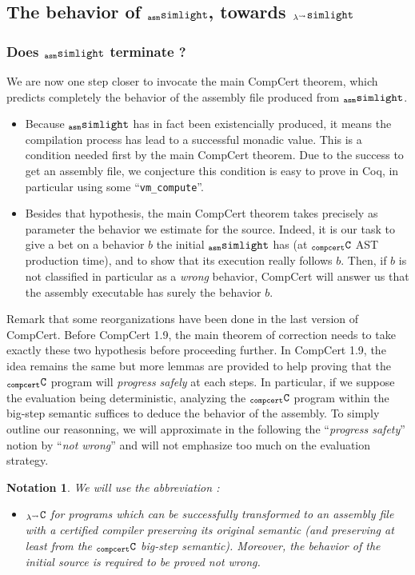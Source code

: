 \documentclass[a4paper, 11pt]{article}
\newcommand{\compcert}{CompCert 1.9\xspace}
\newcommand{\ccert}{CompCert\xspace}
\newcommand{\aSL}{$_{\tt asm}{\tt simlight}$\xspace} %
\newcommand{\lSL}{$_{\lambda^\leadsto}{\tt simlight}$\xspace}
\newcommand{\C}{$_{\tt compcert}{\tt C}$\xspace}
\newcommand{\lC}{$_{\lambda^\leadsto}{\tt C}$\xspace}
\newtheorem*{note}{Notation}
\begin{document}
\subsection{The behavior of \aSL, towards \lSL}
\subsubsection{Does \aSL terminate ?}
We are now one step closer to invocate the main \ccert theorem, which predicts completely the behavior of the assembly file produced from \aSL. 
\begin{itemize}
\item Because \aSL has in fact been existencially produced, it means the compilation process has lead to a successful monadic value. This is a condition needed first by the main \ccert theorem. Due to the success to get an assembly file, we conjecture this condition is easy to prove in Coq, in particular using some ``\verb|vm_compute|''. 
\item Besides that hypothesis, the main \ccert theorem takes precisely as parameter the behavior we estimate for the source. Indeed, it is our task to give a bet on a behavior $b$ the initial \aSL has (at \C AST production time), and to show that its execution really follows $b$. Then, if $b$ is not classified in particular as a \emph{wrong} behavior, \ccert will answer us that the assembly executable has surely the behavior $b$.
\end{itemize}

Remark that some reorganizations have been done in the last version of \ccert. Before \compcert, the main theorem of correction needs to take exactly these two hypothesis before proceeding further. In \compcert, the idea remains the same but more lemmas are provided to help proving that the \C program will \emph{progress safely} at each steps. In particular, if we suppose the evaluation being deterministic, analyzing the \C program within the big-step semantic suffices to deduce the behavior of the assembly. To simply outline our reasonning, we will approximate in the following the ``\emph{progress safety}'' notion by ``\emph{not wrong}'' and will not emphasize too much on the evaluation strategy.

\begin{note}
We will use the abbreviation :
\begin{itemize}
\item \lC for programs which can be successfully transformed to an assembly file with a certified compiler preserving its original semantic (and preserving at least from the \C big-step semantic). Moreover, the behavior of the initial source is required to be proved \emph{not wrong}.
\end{itemize}
\end{note}
\end{document}
